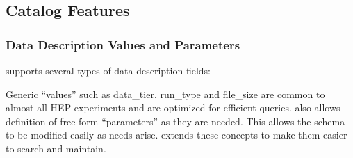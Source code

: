 \documentclass[../main-v1.tex]{subfiles}
\begin{document}


\subsection{Catalog Features}

\subsubsection{Data Description Values and Parameters}

  supports several types of data description fields:



  Generic ``values'' such as data\_tier, run\_type and file\_size  are common to almost all  HEP experiments and are optimized for efficient queries.   also allows definition of free-form ``parameters'' as they are needed.  This allows the schema to be modified easily as needs arise.   extends these concepts to make them easier to search and maintain. 





\end{document}
